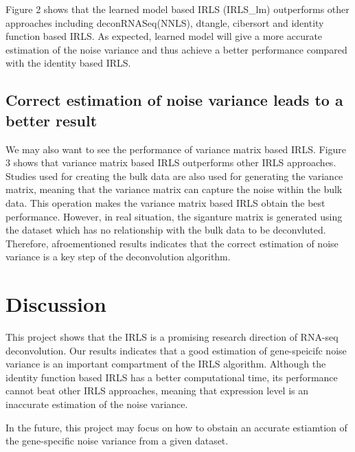 \documentclass[10pt, a4paper, oneside]{article}
\begin{document}
Figure 2 shows that the learned model based IRLS (IRLS\_lm) outperforms other approaches including deconRNASeq(NNLS), dtangle, cibersort and identity function based IRLS.
As expected, learned model will give a more accurate estimation of the noise variance and thus achieve a better performance compared with
the identity based IRLS. 

\subsection{Correct estimation of noise variance leads to a better result}
\justify
We may also want to see the performance of variance matrix based IRLS. Figure 3 shows that variance matrix based IRLS outperforms
other IRLS approaches. Studies used for creating the bulk data are also used for generating the variance matrix, meaning
that the variance matrix can capture the noise within the bulk data. This operation makes the variance matrix based IRLS obtain the 
best performance. However, in real situation, the siganture matrix is generated using the dataset which has no relationship with the bulk data to be deconvluted.
Therefore, afroementioned results indicates that the correct estimation of noise variance is a key step of the deconvolution algorithm.

\section{Discussion}
This project shows that the IRLS is a promising research direction of RNA-seq deconvolution. Our results indicates that a good estimation 
of gene-speicifc noise variance is an important compartment of the IRLS algorithm. Although the identity function based IRLS has a better computational time,
its performance cannot beat other IRLS approaches, meaning that expression level is an inaccurate estimation of the noise variance.

In the future, this project may focus on how to obstain an accurate estiamtion of the gene-specific noise variance from a given dataset.

\medskip



\end{document}
